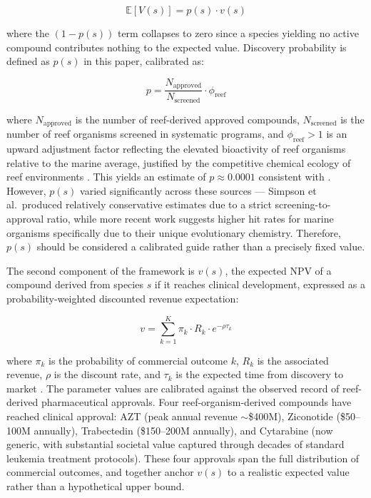 \documentclass[10pt,letterpaper]{article}
\begin{document}
\begin{equation}
\mathbb{E}[V(s)] = p(s) \cdot v(s)
\end{equation}

\noindent where the $(1 - p(s))$ term collapses to zero since a species yielding no active compound contributes nothing to the expected value. Discovery probability is defined as $p(s)$ in this paper, calibrated as:

\begin{equation}
p = \frac{N_{\text{approved}}}{N_{\text{screened}}} \cdot \phi_{\text{reef}}
\end{equation}

\noindent where $N_{\text{approved}}$ is the number of reef-derived approved compounds, $N_{\text{screened}}$ is the number of reef organisms screened in systematic programs, and $\phi_{\text{reef}} > 1$ is an upward adjustment factor reflecting the elevated bioactivity of reef organisms relative to the marine average, justified by the competitive chemical ecology of reef environments \cite{newman2016}. This yields an estimate of $p \approx 0.0001$ consistent with \cite{simpson1996, costello2006, newman2016}. However, $p(s)$ varied significantly across these sources --- Simpson et al.\ produced relatively conservative estimates due to a strict screening-to-approval ratio, while more recent work suggests higher hit rates for marine organisms specifically due to their unique evolutionary chemistry. Therefore, $p(s)$ should be considered a calibrated guide rather than a precisely fixed value.

The second component of the framework is $v(s)$, the expected NPV of a compound derived from species $s$ if it reaches clinical development, expressed as a probability-weighted discounted revenue expectation:

\begin{equation}
v = \sum_{k=1}^{K} \pi_k \cdot R_k \cdot e^{-\rho \tau_k}
\end{equation}

\noindent where $\pi_k$ is the probability of commercial outcome $k$, $R_k$ is the associated revenue, $\rho$ is the discount rate, and $\tau_k$ is the expected time from discovery to market \cite{costello2006}. The parameter values are calibrated against the observed record of reef-derived pharmaceutical approvals. Four reef-organism-derived compounds have reached clinical approval: AZT (peak annual revenue $\sim$\$400M), Ziconotide (\$50--100M annually), Trabectedin (\$150--200M annually), and Cytarabine (now generic, with substantial societal value captured through decades of standard leukemia treatment protocols). These four approvals span the full distribution of commercial outcomes, and together anchor $v(s)$ to a realistic expected value rather than a hypothetical upper bound.
\end{document}
